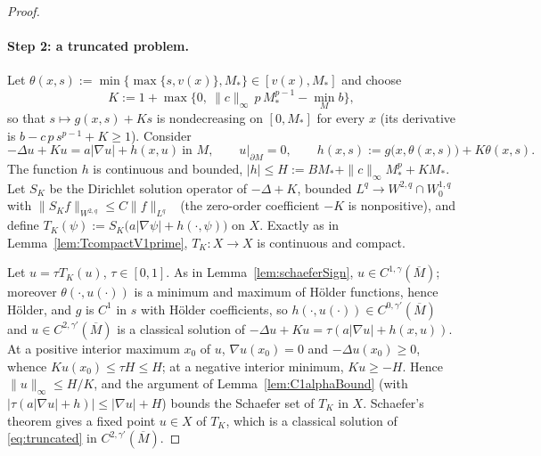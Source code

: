 \documentclass[11pt]{article}
\theoremstyle{plain}
\theoremstyle{definition}
\theoremstyle{remark}
\begin{document}
\begin{proof}
\paragraph{Step 2: a truncated problem.}
Let \(\theta(x,s):=\min\{\max\{s,v(x)\},M_\ast\}\in[v(x),M_\ast]\) and choose
\[
K:=1+\max\Big\{0,\ \|c\|_\infty\,p\,M_\ast^{p-1}-\min_M b\Big\},
\]
so that \(s\mapsto g(x,s)+Ks\) is nondecreasing on \([0,M_\ast]\) for every \(x\) (its derivative is \(b-c\,p\,s^{p-1}+K\ge 1\)). Consider
\begin{equation}\label{eq:truncated}
-\Delta u+Ku=a|\nabla u|+h(x,u)\ \text{in }M,\qquad u|_{\partial M}=0,\qquad h(x,s):=g\big(x,\theta(x,s)\big)+K\theta(x,s).
\end{equation}
The function \(h\) is continuous and bounded, \(|h|\le H:=BM_\ast+\|c\|_\infty M_\ast^p+KM_\ast\). Let \(S_K\) be the Dirichlet solution operator of \(-\Delta+K\), bounded \(L^q\to W^{2,q}\cap W^{1,q}_0\) with \(\|S_Kf\|_{W^{2,q}}\le C\|f\|_{L^q}\)~\cite[Thm.~9.15, Lem.~9.17]{GilbargTrudinger2001} (the zero-order coefficient \(-K\) is nonpositive), and define \(T_K(\psi):=S_K\big(a|\nabla\psi|+h(\cdot,\psi)\big)\) on \(X\). Exactly as in Lemma~\ref{lem:TcompactV1prime}, \(T_K:X\to X\) is continuous and compact.

Let \(u=\tau T_K(u)\), \(\tau\in[0,1]\). As in Lemma~\ref{lem:schaeferSign}, \(u\in C^{1,\gamma}(\overline M)\); moreover \(\theta(\cdot,u(\cdot))\) is a minimum and maximum of H\"older functions, hence H\"older, and \(g\) is \(C^1\) in \(s\) with H\"older coefficients, so \(h(\cdot,u(\cdot))\in C^{0,\gamma'}(\overline M)\) and \(u\in C^{2,\gamma'}(\overline M)\) is a classical solution of \(-\Delta u+Ku=\tau(a|\nabla u|+h(x,u))\). At a positive interior maximum \(x_0\) of \(u\), \(\nabla u(x_0)=0\) and \(-\Delta u(x_0)\ge 0\), whence \(Ku(x_0)\le\tau H\le H\); at a negative interior minimum, \(Ku\ge -H\). Hence \(\|u\|_\infty\le H/K\), and the argument of Lemma~\ref{lem:C1alphaBound} (with \(|\tau(a|\nabla u|+h)|\le|\nabla u|+H\)) bounds the Schaefer set of \(T_K\) in \(X\). Schaefer's theorem gives a fixed point \(u\in X\) of \(T_K\), which is a classical solution of \eqref{eq:truncated} in \(C^{2,\gamma'}(\overline M)\).


\end{proof}
\end{document}
